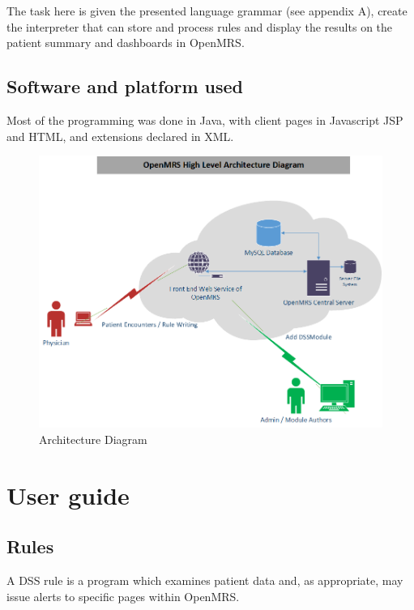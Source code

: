 \documentclass[12pt,letterpaper]{article}
\begin{document}
The task here is given the presented language grammar (see appendix A), create the interpreter that can store and process rules and display the results on the patient summary and dashboards in OpenMRS.

\subsection{Software and platform used}

Most of the programming was done in Java, with client pages in Javascript JSP and HTML, and extensions declared in XML.

\begin{figure}\begin{center}
\includegraphics[width=6.5in]{OpenMRS_Architecture.png}
\end{center}
\caption{Architecture Diagram} \label{fig:ARCHITECTURE}
\end{figure}


\newpage 
\section{User guide}

\subsection{Rules}

A DSS rule is a program which examines patient data and, as 
appropriate, may issue alerts to specific pages within OpenMRS.
\end{document}
